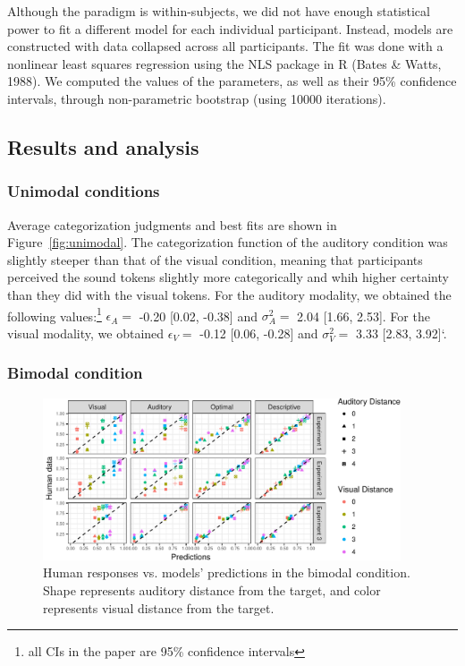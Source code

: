 \documentclass[english,man]{apa6}
\theoremstyle{definition}
\theoremstyle{definition}
\theoremstyle{definition}
\theoremstyle{remark}
\begin{document}
Although the paradigm is within-subjects, we did not have enough
statistical power to fit a different model for each individual
participant. Instead, models are constructed with data collapsed across
all participants. The fit was done with a nonlinear least squares
regression using the NLS package in R (Bates \& Watts, 1988). We
computed the values of the parameters, as well as their 95\% confidence
intervals, through non-parametric bootstrap (using 10000 iterations).

\subsection{Results and analysis}\label{results-and-analysis}

\subsubsection{Unimodal conditions}\label{unimodal-conditions}

Average categorization judgments and best fits are shown in
Figure~\ref{fig:unimodal}. The categorization function of the auditory
condition was slightly steeper than that of the visual condition,
meaning that participants perceived the sound tokens slightly more
categorically and whih higher certainty than they did with the visual
tokens. For the auditory modality, we obtained the following
values:\footnote{all CIs in the paper are 95\% confidence intervals}
\(\epsilon_A=\) -0.20 {[}0.02, -0.38{]} and \(\sigma^2_A=\) 2.04
{[}1.66, 2.53{]}. For the visual modality, we obtained \(\epsilon_V=\)
-0.12 {[}0.06, -0.28{]} and \(\sigma^2_V=\) 3.33 {[}2.83, 3.92{]}`.

\subsubsection{Bimodal condition}\label{bimodal-condition-1}

\begin{figure}

{\centering \includegraphics[width=400px]{ms_files/figure-latex/bimodal-1} 

}

\caption{Human responses vs. models' predictions in the bimodal condition. Shape represents auditory distance from the target, and color represents visual distance from the target.}\label{fig:bimodal}
\end{figure}
\end{document}
